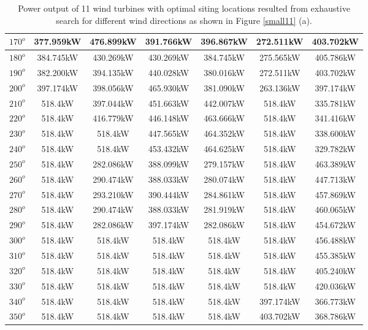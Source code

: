 \begin{table}[H]
\begin{tabular}{|c|c|c|c|c|c|c|}
        		$170^o$	& 377.959kW	& 476.899kW	& 391.766kW	& 396.867kW	& 272.511kW	& 403.702kW	\\ \hline
        		$180^o$	& 384.745kW	& 430.269kW	& 430.269kW	& 384.745kW	& 275.565kW	& 405.786kW	\\ \hline
        		$190^o$	& 382.200kW	& 394.135kW	& 440.028kW	& 380.016kW	& 272.511kW	& 403.702kW	\\ \hline
        		$200^o$	& 397.174kW	& 398.056kW	& 465.930kW	& 381.090kW	& 263.136kW	& 397.174kW	\\ \hline
        		$210^o$	& 518.4kW	& 397.044kW	& 451.663kW	& 442.007kW	& 518.4kW	& 335.781kW	\\ \hline
        		$220^o$	& 518.4kW	& 416.779kW	& 446.148kW	& 463.666kW	& 518.4kW	& 341.416kW	\\ \hline
        		$230^o$	& 518.4kW	& 518.4kW	& 447.565kW	& 464.352kW	& 518.4kW	& 338.600kW	\\ \hline
        		$240^o$	& 518.4kW	& 518.4kW	& 453.432kW	& 464.625kW	& 518.4kW	& 329.782kW	\\ \hline
        		$250^o$	& 518.4kW	& 282.086kW	& 388.099kW	& 279.157kW	& 518.4kW	& 463.389kW	\\ \hline
        		$260^o$	& 518.4kW	& 290.474kW	& 388.033kW	& 280.074kW	& 518.4kW	& 447.713kW	\\ \hline
        		$270^o$	& 518.4kW	& 293.210kW	& 390.444kW	& 284.861kW	& 518.4kW	& 457.869kW	\\ \hline
        		$280^o$	& 518.4kW	& 290.474kW	& 388.033kW	& 281.919kW	& 518.4kW	& 460.065kW	\\ \hline
        		$290^o$	& 518.4kW	& 282.086kW	& 397.174kW	& 282.086kW	& 518.4kW	& 454.672kW	\\ \hline
        		$300^o$	& 518.4kW	& 518.4kW	& 518.4kW	& 518.4kW	& 518.4kW	& 456.488kW	\\ \hline
        		$310^o$	& 518.4kW	& 518.4kW	& 518.4kW	& 518.4kW	& 518.4kW	& 455.385kW	\\ \hline
        		$320^o$	& 518.4kW	& 518.4kW	& 518.4kW	& 518.4kW	& 518.4kW	& 405.240kW	\\ \hline
        		$330^o$	& 518.4kW	& 518.4kW	& 518.4kW	& 518.4kW	& 518.4kW	& 420.036kW	\\ \hline
        		$340^o$	& 518.4kW	& 518.4kW	& 518.4kW	& 518.4kW	& 397.174kW	& 366.773kW	\\ \hline
        		$350^o$	& 518.4kW	& 518.4kW	& 518.4kW	& 518.4kW	& 403.702kW	& 368.786kW	\\ \hline
        	\end{tabular}
        	\caption{Power output of 11 wind turbines with optimal siting locations resulted from exhaustive search for different wind directions as shown in Figure \ref{small11} (a).}
        	\label{table11a}
        \end{table}
